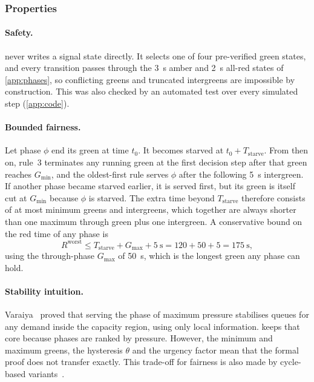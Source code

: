 \subsubsection{Properties}

\paragraph{Safety.} \prism{} never writes a signal state directly. It selects one of four
pre-verified green states, and every transition passes through the 3~s amber and 2~s all-red
states of \cref{app:phases}, so conflicting greens and truncated intergreens are impossible by
construction. This was also checked by an automated test over every simulated step
(\cref{app:code}).

\paragraph{Bounded fairness.} Let phase $\phi$ end its green at time $t_0$. It becomes starved at
$t_0 + T_{\text{starve}}$. From then on, rule~3 terminates any running green at the first decision
step after that green reaches $G_{\min}$, and the oldest-first rule serves $\phi$ after the following
5~s intergreen. If another phase became starved earlier, it is served first, but its green is itself
cut at $G_{\min}$ because $\phi$ is starved. The extra time beyond $T_{\text{starve}}$ therefore
consists of at most minimum greens and intergreens, which together are always shorter than one
maximum through green plus one intergreen. A conservative bound on the red time of any phase is
\begin{equation}
  R^{\text{worst}} \leq T_{\text{starve}} + G_{\max} + 5~\text{s} = 120 + 50 + 5 = 175~\text{s},
  \label{eq:impl-fairness}
\end{equation}
using the through-phase $G_{\max}$ of 50~s, which is the longest green any phase can hold. 

\paragraph{Stability intuition.} Varaiya~\cite{varaiya2013maxpressure} proved that serving the phase
of maximum pressure stabilises queues for any demand inside the capacity region, using only local
information. \prism{} keeps that core because phases are ranked by pressure. However, the minimum and
maximum greens, the hysteresis $\theta$ and the urgency factor mean that the formal proof does not
transfer exactly.  This trade-off for fairness is also made by cycle-based variants~\cite{kouvelas2014maxpressure}.


